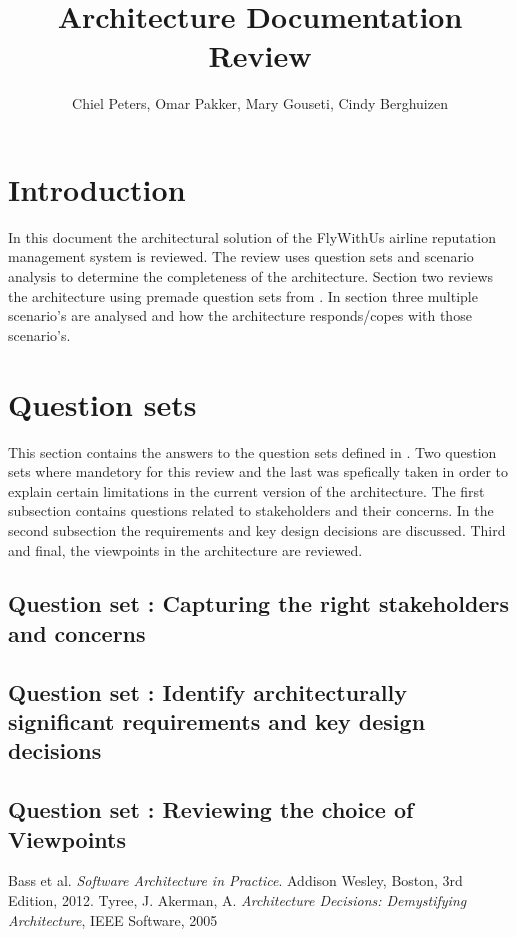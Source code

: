 \documentclass{article}
\begin{document}
\title{Architecture Documentation Review}
\author{Chiel Peters, Omar Pakker, Mary Gouseti, Cindy Berghuizen}
\maketitle
\setlength\parindent{0pt}
\newcommand{\blank}[1]{\hspace*{#1}}

\section{Introduction}

In this document the architectural solution of the FlyWithUs airline reputation management system is reviewed. The review uses question sets and scenario analysis to determine the completeness
of the architecture. Section two reviews the architecture using premade question sets from \cite{tyree}. In section three multiple scenario's are analysed and how the architecture responds/copes with those scenario's. 

\section{Question sets}

This section contains the answers to the question sets defined in \cite{tyree}. Two question sets where mandetory for this review and the last was spefically taken in order to explain certain limitations in the current version of
the architecture. The first subsection contains questions related to stakeholders and their concerns. In the second subsection the requirements and key design decisions are discussed. Third and final, the viewpoints in the architecture
are reviewed.

\subsection{Question set : Capturing the right stakeholders and concerns}


\newpage
\subsection{Question set : Identify architecturally significant requirements and key design decisions}


\newpage
\subsection{Question set : Reviewing the choice of Viewpoints}
\newpage


\begin{thebibliography}{9}
Bass et al.
  \emph{Software Architecture in Practice}.
  Addison Wesley, Boston,
  3rd Edition,
  2012.
Tyree, J.  Akerman, A. 
\emph{Architecture Decisions:
Demystifying Architecture},
IEEE Software,
2005

\end{thebibliography}
\end{document}
